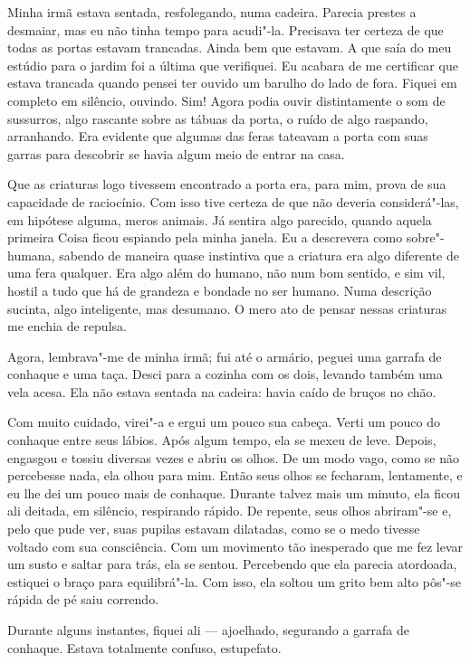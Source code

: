 Minha irmã estava sentada, resfolegando, numa cadeira. Parecia prestes a desmaiar, mas eu não tinha tempo para
acudi"-la. Precisava ter certeza de que todas as portas estavam trancadas. Ainda bem que estavam. A que saía do meu
estúdio para o jardim foi a última que verifiquei. Eu acabara de me certificar que estava trancada quando pensei ter
ouvido um barulho do lado de fora. Fiquei em completo em silêncio, ouvindo. Sim! Agora podia ouvir distintamente o
som de sussurros, algo rascante sobre as tábuas da porta, o ruído de algo raspando, arranhando. Era evidente que algumas
das feras tateavam a porta com suas garras para descobrir se havia algum meio de entrar na casa.

Que as criaturas logo tivessem encontrado a porta era, para mim, prova de sua capacidade de raciocínio. Com isso tive
certeza de que não deveria considerá"-las, em hipótese alguma, meros animais. Já sentira algo parecido, quando aquela
primeira Coisa ficou espiando pela minha janela. Eu a descrevera como sobre"-humana, sabendo de maneira quase instintiva
que a criatura era algo diferente de uma fera qualquer. Era algo além do humano, não num bom sentido, e sim vil,
hostil a tudo que há de grandeza e bondade no ser humano. Numa descrição sucinta, algo inteligente, mas desumano. O mero
ato de pensar nessas criaturas me enchia de repulsa.

Agora, lembrava"-me de minha irmã; fui até o armário, peguei uma garrafa de conhaque e uma taça. Desci para a cozinha
com os dois, levando também uma vela acesa. Ela não estava sentada na cadeira: havia caído de bruços no chão.

Com muito cuidado, virei"-a e ergui um pouco sua cabeça. Verti um pouco do conhaque entre seus lábios. Após algum tempo,
ela se mexeu de leve. Depois, engasgou e tossiu diversas vezes e abriu os olhos. De um modo vago, como se não percebesse
nada, ela olhou para mim. Então seus olhos se fecharam, lentamente, e eu lhe dei um pouco mais de conhaque. Durante
talvez mais um minuto, ela ficou ali deitada, em silêncio, respirando rápido. De repente, seus olhos abriram"-se e,
pelo que pude ver, suas pupilas estavam dilatadas, como se o medo tivesse voltado com sua consciência.
Com um movimento tão inesperado que me fez levar um susto e saltar para trás, ela se sentou. Percebendo que ela
parecia atordoada, estiquei o braço para equilibrá"-la. Com isso, ela soltou um grito bem alto pôs"-se rápida de
pé saiu correndo.

Durante alguns instantes, fiquei ali --- ajoelhado, segurando a garrafa de conhaque. Estava totalmente
confuso, estupefato.

